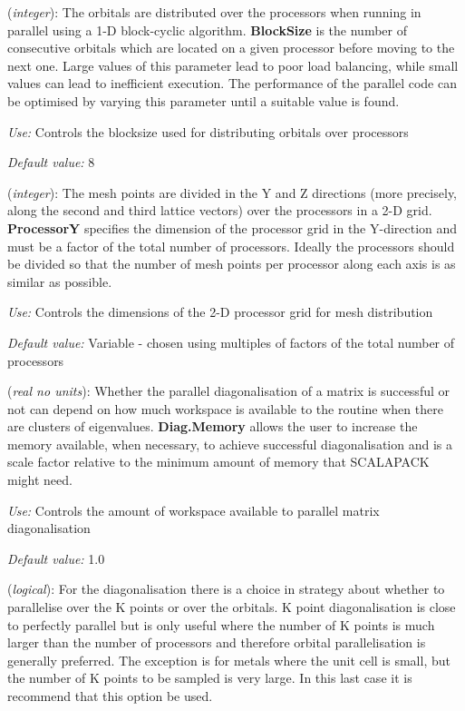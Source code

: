 \documentclass[11pt]{article}
\begin{document}
\begin{description}
\itemsep 10pt
\parsep 0pt

\item[{\bf BlockSize}] ({\it integer}):  The orbitals are distributed over the processors when
running in parallel using a 1-D block-cyclic algorithm. {\bf
BlockSize} is the number of consecutive orbitals which are located on
a given processor before moving to the next one. Large values of this
parameter lead to poor load balancing, while small values can lead to
inefficient execution.  The performance of the parallel code can be
optimised by varying this parameter until a suitable value is found.

{\it Use:} Controls the blocksize used for distributing orbitals over
processors

{\it Default value:}  8

\item[{\bf ProcessorY}] ({\it integer}):  The mesh points are divided in the Y and Z directions
(more precisely, along the second and third lattice vectors)
over the processors in a 2-D grid. {\bf ProcessorY} specifies the
dimension of the processor grid in the Y-direction and must be a
factor of the total number of processors. Ideally the processors
should be divided so that the number of mesh points per processor
along each axis is as similar as possible.

{\it Use:} Controls the dimensions of the 2-D processor grid for mesh
distribution

{\it Default value:} Variable - chosen using multiples of factors of
  the total number of processors

\item[{\bf Diag.Memory}] ({\it real no units}):
Whether the parallel diagonalisation of a matrix is successful or not can
depend on how much workspace is available to the routine when there are
clusters of eigenvalues. {\bf Diag.Memory} allows the user to increase
the memory available, when necessary, to achieve successful diagonalisation
and is a scale factor relative to the minimum amount of memory that
SCALAPACK might need.

{\it Use:} Controls the amount of workspace available to parallel
matrix diagonalisation

{\it Default value:}  1.0

\item[{\bf Diag.ParallelOverK}] ({\it logical}):  For the diagonalisation there is a choice in strategy
about whether to parallelise over the K points or over the orbitals. K
point diagonalisation is close to perfectly parallel but is only
useful where the number of K points is much larger than the number of
processors and therefore orbital parallelisation is generally
preferred. The exception is for metals where the unit cell is small,
but the number of K points to be sampled is very large. In this last
case it is recommend that this option be used.


\end{description}
\end{document}
